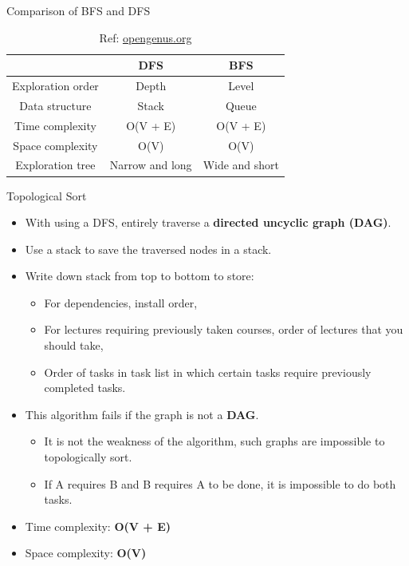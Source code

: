 \documentclass[aspectratio=169]{beamer}%
\begin{document}
\begin{frame}{Comparison of BFS and DFS}
    \begin{table}[ht]
        \centering
        \begin{tabular}{|c||c|c|}
            \hline
             & DFS & BFS \\
             \hline
            Exploration order & Depth & Level\\
            Data structure & Stack & Queue\\
            Time complexity & O(V + E) & O(V + E)\\
            Space complexity & O(V) & O(V)\\
            Exploration tree & Narrow and long & Wide and short\\
            \hline
        \end{tabular}
        \caption{Ref: \href{https://iq.opengenus.org/dfs-vs-bfs/}{\underline{opengenus.org}}}
    \end{table}
\end{frame}

\begin{frame}{Topological Sort}
    \begin{itemize}
        \item With using a DFS, entirely traverse a \textbf{directed uncyclic graph (DAG)}.
        \item Use a stack to save the traversed nodes in a stack.
        \item Write down stack from top to bottom to store:
            \begin{itemize}
                \item For dependencies, install order,
                \item For lectures requiring previously taken courses, order of lectures that you should take,
                \item Order of tasks in task list in which certain tasks require previously completed tasks.
            \end{itemize}
        \item This algorithm fails if the graph is not a \textbf{DAG}.
            \begin{itemize}
                \item It is not the weakness of the algorithm, such graphs are impossible to topologically sort.
                \item If A requires B and B requires A to be done, it is impossible to do both tasks. 
            \end{itemize}
        \item Time complexity: \textbf{O(V + E)}
        \item Space complexity: \textbf{O(V)}
    \end{itemize}
\end{frame}
\end{document}
